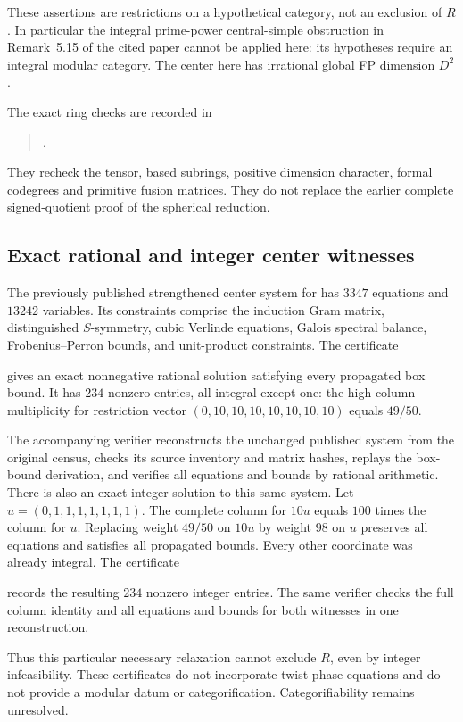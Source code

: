 These assertions are restrictions on a hypothetical category, not an
exclusion of $R$. In particular the integral prime-power central-simple
obstruction in Remark~5.15 of the cited paper cannot be applied here:
its hypotheses require an integral modular category. The center here
has irrational global FP dimension $D^2$.

The exact ring checks are recorded in
\begin{quote}\small
{}.
\end{quote}
They recheck the tensor, based subrings, positive dimension character,
formal codegrees and primitive fusion matrices. They do not replace
the earlier complete signed-quotient proof of the spherical reduction.


\subsection{Exact rational and integer center witnesses}
\label{subsec:r3472-focus-rational-center}

The previously published strengthened center system for
 has $3347$ equations and $13242$ variables. Its
constraints comprise the induction Gram matrix, distinguished
$S$-symmetry, cubic Verlinde equations, Galois spectral balance,
Frobenius--Perron bounds, and unit-product constraints. The certificate
\begin{quote}\small
{}
\end{quote}
gives an exact nonnegative rational solution satisfying every propagated
box bound. It has $234$ nonzero entries, all integral except one:
the high-column multiplicity for restriction vector
$(0,10,10,10,10,10,10,10)$ equals $49/50$.

The accompanying verifier reconstructs the unchanged published system
from the original census, checks its source inventory and matrix hashes,
replays the box-bound derivation, and verifies all equations and bounds
by rational arithmetic. There is also an exact integer solution to this same system. Let
$u=(0,1,1,1,1,1,1,1)$. The complete column for $10u$ equals $100$ times
the column for $u$. Replacing weight $49/50$ on $10u$ by weight $98$
on $u$ preserves all equations and satisfies all propagated bounds.
Every other coordinate was already integral. The certificate
\begin{quote}\small
{}
\end{quote}
records the resulting $234$ nonzero integer entries. The same verifier
checks the full column identity and all equations and bounds for both
witnesses in one reconstruction.

Thus this particular necessary relaxation cannot exclude $R$, even by
integer infeasibility. These certificates do not incorporate twist-phase
equations and do not provide a modular datum or categorification.
Categorifiability remains unresolved.

